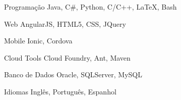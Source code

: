 

\begin{cvskills}

  \cvskill
    {Programação} %
    {Java, C\#, Python, C/C++, LaTeX, Bash} %

  \cvskill
    {Web} %
    {AngularJS, HTML5, CSS, JQuery} %

  \cvskill
    {Mobile} %
    {Ionic, Cordova} %
    
  \cvskill
    {Cloud Tools} %
    {Cloud Foundry, Ant, Maven} %

  \cvskill
    {Banco de Dados} %
    {Oracle, SQLServer, MySQL} %
        
  \cvskill
    {Idiomas} %
    {Inglês, Português, Espanhol} %
    

\end{cvskills}

